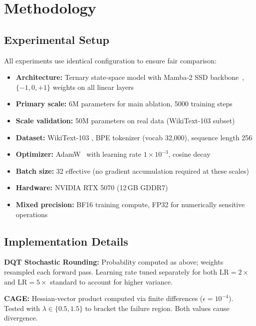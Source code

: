 \documentclass{article}
\begin{document}
\section{Methodology}

\subsection{Experimental Setup}

All experiments use identical configuration to ensure fair comparison:

\begin{itemize}
    \item \textbf{Architecture:} Ternary state-space model with Mamba-2 SSD backbone~\citep{dao2024transformers, gu2024mamba}, $\{-1, 0, +1\}$ weights on all linear layers
    \item \textbf{Primary scale:} 6M parameters for main ablation, 5000 training steps
    \item \textbf{Scale validation:} 50M parameters on real data (WikiText-103 subset)
    \item \textbf{Dataset:} WikiText-103 \citep{merity2017pointer}, BPE tokenizer (vocab 32,000), sequence length 256
    \item \textbf{Optimizer:} AdamW~\citep{loshchilov2019decoupled} with learning rate $1 \times 10^{-3}$, cosine decay
    \item \textbf{Batch size:} 32 effective (no gradient accumulation required at these scales)
    \item \textbf{Hardware:} NVIDIA RTX 5070 (12\,GB GDDR7)
    \item \textbf{Mixed precision:} BF16 training compute, FP32 for numerically sensitive operations
\end{itemize}

\subsection{Implementation Details}

\textbf{DQT Stochastic Rounding:} Probability computed as above; weights resampled each forward pass. Learning rate tuned separately for both $\text{LR}=2\times$ and $\text{LR}=5\times$ standard to account for higher variance.

\textbf{CAGE:} Hessian-vector product computed via finite differences ($\epsilon = 10^{-4}$). Tested with $\lambda \in \{0.5, 1.5\}$ to bracket the failure region. Both values cause divergence.
\end{document}
